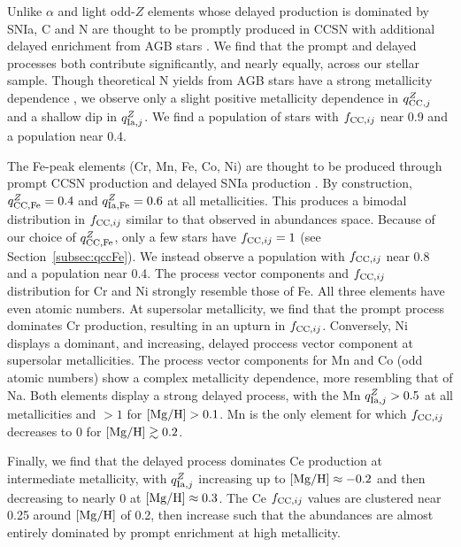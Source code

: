 \documentclass[modern]{aastex631}
\newcommand{\mgh}{[{\rm Mg}/{\rm H}]}
\newcommand{\qcc}{q_{{\rm CC,}j}^{Z}}
\newcommand{\qccFe}{q_{{\rm CC, Fe}}^{Z}}
\newcommand{\qIa}{q_{{\rm Ia,}j}^{Z}}
\newcommand{\qIaFe}{q_{{\rm Ia,Fe}}^{Z}}
\newcommand{\fcc}{f_{{\rm CC}, ij}}
\begin{document}
Unlike $\alpha$ and light odd-$Z$ elements whose delayed production is dominated by SNIa, C and N are thought to be promptly produced in CCSN with additional delayed enrichment from AGB stars \citep[e.g.][]{andrews2017}. We find that the prompt and delayed processes both contribute significantly, and nearly equally, across our stellar sample. Though theoretical N yields from AGB stars have a strong metallicity dependence \citep{karakas2010, ventura2013, cristallo2015, johnson2022}, we observe only a slight positive metallicity dependence in $\qcc$ and a shallow dip in $\qIa$. We find a population of stars with $\fcc$ near 0.9 and a population near 0.4. 

The Fe-peak elements (Cr, Mn, Fe, Co, Ni) are thought to be produced through prompt CCSN production and delayed SNIa production \citep[e.g.][]{andrews2017}. By construction, $\qccFe=0.4$ and $\qIaFe=0.6$ at all metallicities. This produces a bimodal distribution in $\fcc$ similar to that observed in abundances space. Because of our choice of $\qccFe$, only a few stars have $\fcc=1$ (see Section~\ref{subsec:qccFe}). We instead observe a population with $\fcc$ near 0.8 and a population near 0.4. The process vector components and $\fcc$ distribution for Cr and Ni strongly resemble those of Fe. All three elements have even atomic numbers. At supersolar metallicity, we find that the prompt process dominates Cr production, resulting in an upturn in $\fcc$. Conversely, Ni displays a dominant, and increasing, delayed proccess vector component at supersolar metallicities. The process vector components for Mn and Co (odd atomic numbers) show a complex metallicity dependence, more resembling that of Na. Both elements display a strong delayed process, with the Mn $\qIa > 0.5$ at all metallicities and $> 1$ for $\mgh > 0.1$. Mn is the only element for which $\fcc$ decreases to 0 for $\mgh \gtrsim 0.2$. 

Finally, we find that the delayed process dominates Ce production at intermediate metallicity, with $\qIa$ increasing up to $\mgh \approx -0.2$ and then decreasing to nearly 0 at $\mgh \approx 0.3$. The Ce $\fcc$ values are clustered near 0.25 around $\mgh$ of 0.2, then increase such that the abundances are almost entirely dominated by prompt enrichment at high metallicity.
\end{document}
